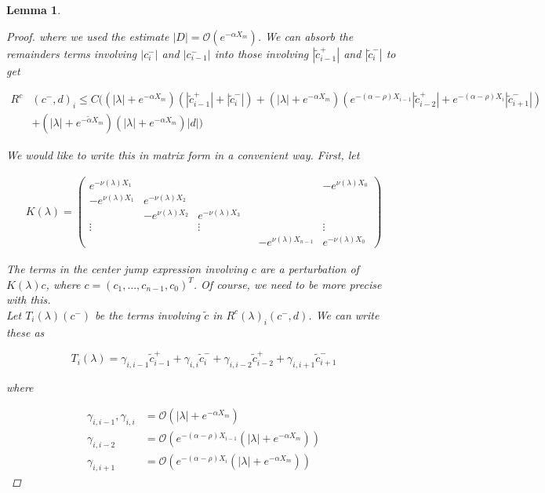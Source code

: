 \documentclass[12pt]{article}
\newtheorem{lemma}{Lemma}
\begin{document}
\begin{lemma}
\begin{proof}
where we used the estimate $|D| = \mathcal{O}(e^{-\alpha X_m})$. We can absorb the remainders terms involving $|c_i^-|$ and $|c_{i-1}^-|$ into those involving $|\tilde{c}_{i-1}^+|$ and $|\tilde{c}_{i}^-|$ to get

\begin{align*}
R^c&(c^-, d)_i \leq C \Big(
(|\lambda| + e^{-\alpha X_m})(|\tilde{c}_{i-1}^+| + |\tilde{c}_{i}^-|) + (|\lambda| + e^{-\alpha X_m})( e^{-(\alpha - \rho) X_{i-1}} |\tilde{c}_{i-2}^+| + e^{-(\alpha - \rho) X_i} |\tilde{c}_{i+1}^-|)  \\
&+ (|\lambda| + e^{-\tilde{\alpha} X_m})(|\lambda| + e^{-\alpha X_m})|d|
\Big)
\end{align*}

We would like to write this in matrix form in a convenient way. First, let

\begin{align*}
K(\lambda) =  
\begin{pmatrix}
e^{-\nu(\lambda)X_1} & & & & & -e^{\nu(\lambda)X_0} \\
-e^{\nu(\lambda)X_1} & e^{-\nu(\lambda)X_2} \\
& -e^{\nu(\lambda)X_2} & e^{-\nu(\lambda)X_3} \\
\vdots & & \vdots & &&  \vdots \\
& & & & -e^{\nu(\lambda)X_{n-1}} & e^{-\nu(\lambda)X_0} 
\end{pmatrix}
\end{align*}

The terms in the center jump expression involving $c$ are a perturbation of $K(\lambda)c$, where $c = (c_1, \dots, c_{n-1}, c_0)^T$. Of course, we need to be more precise with this.\\

Let $T_i(\lambda)(c^-)$ be the terms involving $\tilde{c}$ in $R^c(\lambda)_i(c^-, d)$. We can write these as

\[
T_i(\lambda) = \gamma_{i,i-1} \tilde{c}_{i-1}^+ + \gamma_{i,i} \tilde{c}_{i}^- + \gamma_{i,i-2} \tilde{c}_{i-2}^+ + \gamma_{i,i+1} \tilde{c}_{i+1}^-
\] 

where

\begin{align*}
\gamma_{i,i-1}, \gamma_{i,i} &= \mathcal{O}(|\lambda| + e^{-\alpha X_m}) \\
\gamma_{i,i-2} &= \mathcal{O}(e^{-(\alpha - \rho) X_{i-1}}(|\lambda| + e^{-\alpha X_m})) \\
\gamma_{i,i+1} &= \mathcal{O}(e^{-(\alpha - \rho) X_i}(|\lambda| + e^{-\alpha X_m}))
\end{align*}


\end{proof}
\end{lemma}
\end{document}
